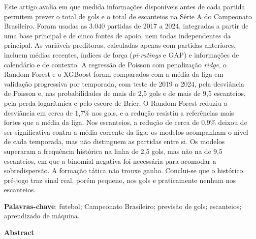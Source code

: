 \begin{resumoumacoluna}

Este artigo avalia em que medida informações disponíveis antes de cada partida permitem prever o total de gols e o total de escanteios na Série A do Campeonato Brasileiro. Foram usadas as 3.040 partidas de 2017 a 2024, integradas a partir de uma base principal e de cinco fontes de apoio, nem todas independentes da principal. As variáveis preditoras, calculadas apenas com partidas anteriores, incluem médias recentes, índices de força (\textit{pi-ratings} e GAP) e informações de calendário e de contexto. A regressão de Poisson com penalização \textit{ridge}, o Random Forest e o XGBoost foram comparados com a média da liga em validação progressiva por temporada, com teste de 2019 a 2024, pela desviância de Poisson e, nas probabilidades de mais de 2,5 gols e de mais de 9,5 escanteios, pela perda logarítmica e pelo escore de Brier. O Random Forest reduziu a desviância em cerca de 1,7\% nos gols, e a redução resistiu a referências mais fortes que a média da liga. Nos escanteios, a redução de cerca de 0,9\% deixou de ser significativa contra a média corrente da liga: os modelos acompanham o nível de cada temporada, mas não distinguem as partidas entre si. Os modelos superaram a frequência histórica na linha de 2,5 gols, mas não na de 9,5 escanteios, em que a binomial negativa foi necessária para acomodar a sobredispersão. A formação tática não trouxe ganho. Conclui-se que o histórico pré-jogo traz sinal real, porém pequeno, nos gols e praticamente nenhum nos escanteios.

\vspace{\onelineskip}

\noindent
\textbf{Palavras-chave}: futebol; Campeonato Brasileiro; previsão de gols; escanteios; aprendizado de máquina.

\end{resumoumacoluna}

\vspace{\onelineskip}

\begin{center}
    \textbf{\large Abstract}
\end{center}

